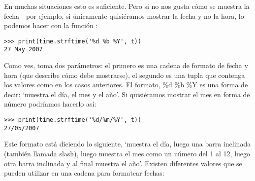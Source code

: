 \noindent
En muchas situaciones esto es suficiente. Pero si no nos gusta cómo se muestra la fecha---por ejemplo, si únicamente quisiéramos mostrar la fecha y no la hora, lo podemos hacer con la función :

\begin{listing}
\begin{verbatim}
>>> print(time.strftime('%d %b %Y', t))
27 May 2007
\end{verbatim}
\end{listing}

Como ves,  toma dos parámetros:   el primero es una cadena de formato de fecha y hora (que describe cómo debe mostrarse), el segundo es una tupla que contenga los valores como en los casos anteriores.   El formato, \%d \%b \%Y es una forma de decir: `muestra el día, el mes y el año'.  Si quisiéramos mostrar el mes en forma de número podríamos hacerlo así:

\begin{listing}
\begin{verbatim}
>>> print(time.strftime('%d/%m/%Y', t))
27/05/2007
\end{verbatim}
\end{listing}

Este formato está diciendo lo siguiente, `muestra el día, luego una barra inclinada (también llamada slash), luego muestra el mes como un número del 1 al 12, luego otra barra inclinada y al final muestra el año'.  Existen diferentes valores que se pueden utilizar en una cadena para formatear fechas:

